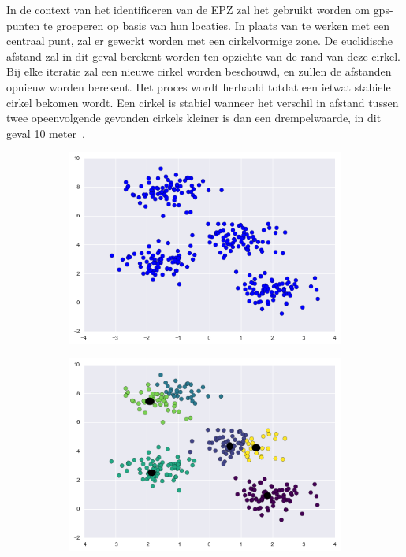 In de context van het identificeren van de \ac{EPZ} zal het gebruikt worden om
\ac{gps}-punten te groeperen op basis van hun locaties. In plaats van te werken
met een centraal punt, zal er gewerkt worden met een cirkelvormige zone. De
euclidische afstand zal in dit geval berekent worden ten opzichte van de rand
van deze cirkel. Bij elke iteratie zal een nieuwe cirkel worden beschouwd, en
zullen de afstanden opnieuw worden berekent. Het proces wordt herhaald totdat
een ietwat stabiele cirkel bekomen wordt. Een cirkel is stabiel wanneer het
verschil in afstand tussen twee opeenvolgende gevonden cirkels kleiner is dan
een drempelwaarde, in dit geval 10
meter~\cite{Dhondt, Verdonck_2022}.
\begin{figure}[h]
    \centering
    \begin{subfigure}[b]{.33\textwidth}
        \centering
        \includegraphics[width=1\textwidth]{fig/kmeans/1.png}
    \end{subfigure}\hfill
    \begin{subfigure}[b]{.33\textwidth}
        \centering
        \includegraphics[width=1\textwidth]{fig/kmeans/2.png}

\end{subfigure}
\end{figure}
